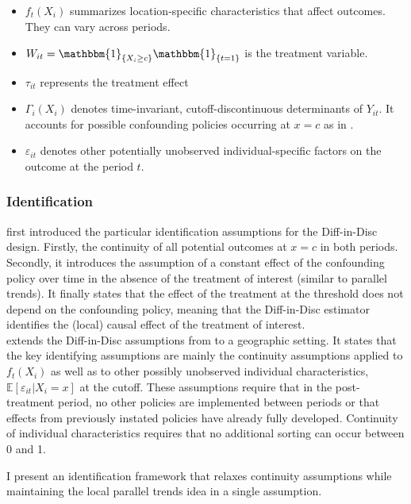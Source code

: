 \documentclass[12pt]{article}
\theoremstyle{plain}
\theoremstyle{remark}
\begin{document}
    \begin{itemize}
        \item $f_t(X_i)$ summarizes location-specific characteristics that affect outcomes. They can vary across periods.
        \item $W_{it} = \mathbbm{1}_{\{X_i\geq c\}} \mathbbm{1}_{\{t=1\}} $ is the treatment variable.
        \item $\tau_{it}$ represents the treatment effect
        \item $\Gamma_{i}(X_i)$ denotes time-invariant, cutoff-discontinuous determinants of $Y_{it}$. It accounts for possible confounding policies occurring at $x=c$ as in \textcite{grembi2016do}.
        \item $\varepsilon_{it}$ denotes other potentially unobserved individual-specific factors on the outcome at the period $t$.
    \end{itemize}


\subsubsection{Identification}
\textcite{grembi2016do} first introduced the particular identification assumptions for the Diff-in-Disc design. Firstly, the continuity of all potential outcomes at $x=c$ in both periods. Secondly, it introduces the assumption of a constant effect of the confounding policy over time in the absence of the treatment of interest (similar to parallel trends). It finally states that the effect of the treatment at the threshold does not depend on the confounding policy, meaning that the Diff-in-Disc estimator identifies the (local) causal effect of the treatment of interest.\\

\textcite{Butts_2023} extends the Diff-in-Disc assumptions from \textcite{grembi2016do} to a geographic setting. It states that the key identifying assumptions are mainly the continuity assumptions applied to $f_t(X_i)$ as well as to other possibly unobserved individual characteristics, $\mathbb{E} \left[ \varepsilon_{it}|X_i=x \right]$ at the cutoff. These assumptions require that in the post-treatment period, no other policies are implemented between periods or that effects from previously instated policies have already fully developed. Continuity of individual characteristics requires that no additional sorting can occur between 0 and 1.

I present an identification framework that relaxes continuity assumptions while maintaining the local parallel trends idea in a single assumption.
\end{document}
